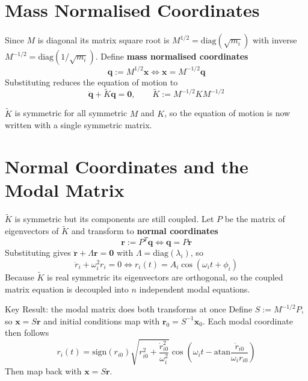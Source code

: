 \documentclass[10pt,a4paper]{article}
\begin{document}
\section{Mass Normalised Coordinates}
Since $M$ is diagonal its matrix square root is $M^{1/2} = \mathrm{diag}(\sqrt{m_i})$ with inverse $M^{-1/2} = \mathrm{diag}(1/\sqrt{m_i})$. Define \textbf{mass normalised coordinates}
\begin{equation}
  \mathbf{q} := M^{1/2}\mathbf{x} \iff \mathbf{x} = M^{-1/2}\mathbf{q}
\end{equation}
Substituting reduces the equation of motion to
\begin{equation}
  \ddot{\mathbf{q}} + \widetilde{K}\mathbf{q} = \mathbf{0}, \qquad \widetilde{K} := M^{-1/2}K M^{-1/2}
\end{equation}
\begin{varlist}
\end{varlist}
$\widetilde{K}$ is symmetric for all symmetric $M$ and $K$, so the equation of motion is now written with a single symmetric matrix.

\section{Normal Coordinates and the Modal Matrix}
$\widetilde{K}$ is symmetric but its components are still coupled. Let $P$ be the matrix of eigenvectors of $\widetilde{K}$ and transform to \textbf{normal coordinates}
\begin{equation}
  \mathbf{r} := P^{T}\mathbf{q} \iff \mathbf{q} = P\mathbf{r}
\end{equation}
Substituting gives $\ddot{\mathbf{r}} + \Lambda\mathbf{r} = \mathbf{0}$ with $\Lambda = \mathrm{diag}(\lambda_i)$, so
\begin{equation}
  \ddot{r}_i + \omega_i^2 r_i = 0 \iff r_i(t) = A_i\cos(\omega_i t + \phi_i)
\end{equation}
Because $\widetilde{K}$ is real symmetric its eigenvectors are orthogonal, so the coupled matrix equation is decoupled into $n$ independent modal equations.

\begin{keybox}{Key Result: the modal matrix does both transforms at once}
Define $S := M^{-1/2}P$, so $\mathbf{x} = S\mathbf{r}$ and initial conditions map with $\mathbf{r}_0 = S^{-1}\mathbf{x}_0$. Each modal coordinate then follows
\[
  r_i(t) = \mathrm{sign}(r_{i0})\sqrt{r_{i0}^2 + \frac{\dot{r}_{i0}^2}{\omega_i^2}}\cos\!\left(\omega_i t - \mathrm{atan}\frac{\dot{r}_{i0}}{\omega_i r_{i0}}\right)
\]
Then map back with $\mathbf{x} = S\mathbf{r}$.
\end{keybox}
\end{document}
